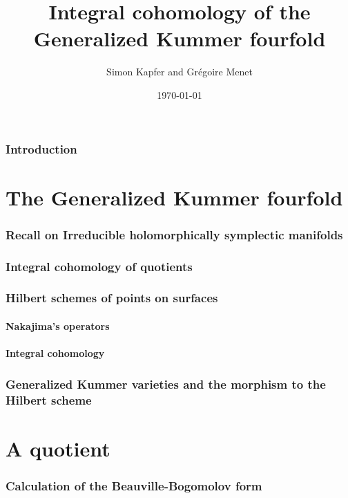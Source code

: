\documentclass[a4paper]{article}
\begin{document}
\title{Integral cohomology of the Generalized Kummer fourfold}


\author{Simon Kapfer and Gr\'egoire Menet}


\date{\today}

\maketitle
\section{Introduction}
\part{The Generalized Kummer fourfold}

\section{Recall on Irreducible holomorphically symplectic manifolds}
\section{Integral cohomology of quotients}
\section{Hilbert schemes of points on surfaces}
	\subsection{Nakajima's operators}
	\subsection{Integral cohomology}
\section{Generalized Kummer varieties and the morphism to the Hilbert scheme}


\part{A quotient}
\section{Calculation of the Beauville-Bogomolov form}


\end{document}
